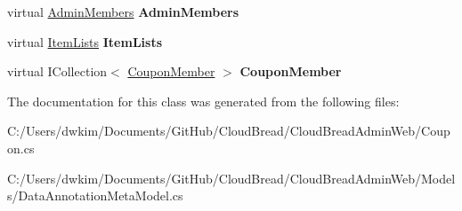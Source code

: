 \begin{DoxyCompactItemize}
\item 
virtual \hyperlink{a00012}{Admin\+Members} {\bfseries Admin\+Members}\hypertarget{a00068_a2cea3373184b3b9101d7244be570c740}{}\label{a00068_a2cea3373184b3b9101d7244be570c740}

\item 
virtual \hyperlink{a00127}{Item\+Lists} {\bfseries Item\+Lists}\hypertarget{a00068_abbdc48bad1a549486f69865e50507467}{}\label{a00068_abbdc48bad1a549486f69865e50507467}

\item 
virtual I\+Collection$<$ \hyperlink{a00069}{Coupon\+Member} $>$ {\bfseries Coupon\+Member}\hypertarget{a00068_a817e450441acc539f1a1cd482feca6fc}{}\label{a00068_a817e450441acc539f1a1cd482feca6fc}

\end{DoxyCompactItemize}


The documentation for this class was generated from the following files\+:\begin{DoxyCompactItemize}
\item 
C\+:/\+Users/dwkim/\+Documents/\+Git\+Hub/\+Cloud\+Bread/\+Cloud\+Bread\+Admin\+Web/Coupon.\+cs\item 
C\+:/\+Users/dwkim/\+Documents/\+Git\+Hub/\+Cloud\+Bread/\+Cloud\+Bread\+Admin\+Web/\+Models/Data\+Annotation\+Meta\+Model.\+cs\end{DoxyCompactItemize}
